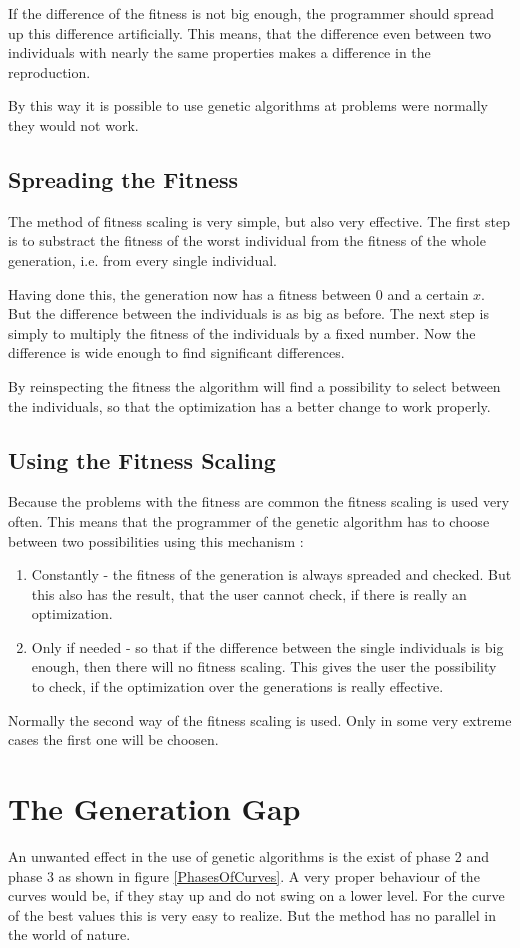 If the difference of the fitness is not big enough, the programmer should spread
up this difference artificially. This means, that the difference even between
two individuals with nearly the same properties makes a difference in the reproduction.

By this way it is possible to use genetic algorithms at problems were normally
they would not work.

\subsection{Spreading the Fitness}
The method of fitness scaling is very simple, but also very effective. The first
step is to substract the fitness of the worst individual from the fitness of
the whole generation, i.e. from every single individual.

Having done this, the generation now has a fitness between 0 and a certain $x$.
But the difference between the individuals is as big as before. The next step
is simply to multiply the fitness of the individuals by a fixed number. Now the
difference is wide enough to find significant differences.

By reinspecting the fitness the algorithm will find a possibility to select between
the individuals, so that the optimization has a better change to work properly.
\subsection{Using the Fitness Scaling}
Because the problems with the fitness are common the fitness scaling is used
very often. This means that the programmer of the genetic algorithm has to choose
between two possibilities using this mechanism :
\begin{enumerate}
  \item Constantly - the fitness of the generation is always spreaded and checked.
But this also has the result, that the user cannot check, if there is really
an optimization.
  \item Only if needed - so that if the difference between the single individuals
is big enough, then there will no fitness scaling. This gives the user the possibility
to check, if the optimization over the generations is really effective.
\end{enumerate}
Normally the second way of the fitness scaling is used. Only in some very extreme
cases the first one will be choosen.
\section{The Generation Gap}
An unwanted effect in the use of genetic algorithms is the exist of phase 2 and
phase 3 as shown in figure \ref{PhasesOfCurves}. A very proper behaviour of the 
curves would be, if they stay up and
do not swing on a lower level. For the curve of the best values this is very easy
to realize. But the method has no parallel in the world of nature.

